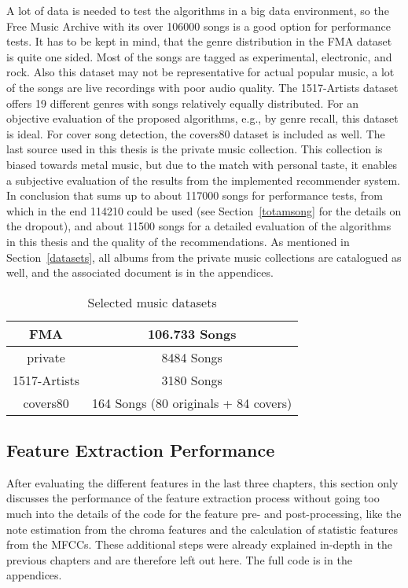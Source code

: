 A lot of data is needed to test the algorithms in a big data environment, so the Free Music Archive with its over 106000 songs is a good option for performance tests. It has to be kept in mind, that the genre distribution in the FMA dataset is quite one sided. Most of the songs are tagged as experimental, electronic, and rock. Also this dataset may not be representative for actual popular music, a lot of the songs are live recordings with poor audio quality. %
The 1517-Artists dataset offers 19 different genres with songs relatively equally distributed. For an objective evaluation of the proposed algorithms, e.g., by genre recall, this dataset is ideal. For cover song detection, the covers80 dataset is included as well.
The last source used in this thesis is the private music collection. This collection is biased towards metal music, but due to the match with personal taste, it enables a subjective evaluation of the results from the implemented recommender system.
In conclusion that sums up to about 117000 songs for performance tests, from which in the end 114210 could be used (see Section~\ref{totamsong} for the details on the dropout), and about 11500 songs for a detailed evaluation of the algorithms in this thesis and the quality of the recommendations. As mentioned in Section~\ref{datasets}, all albums from the private music collections are catalogued as well, and the associated document is in the appendices. 

\begin{table}[h]
	\label{used_dsets}
	\begin{center}
		\begin{tabular}{|c||c|}
			\hline
			FMA & 106.733 Songs\\
			\hline
			private & 8484 Songs\\
			\hline
			1517-Artists & 3180 Songs\\
			\hline
			covers80 & 164 Songs (80 originals + 84 covers)\\
			\hline
		\end{tabular}
	\end{center}
	\caption{Selected music datasets}
\end{table}
\FloatBarrier

\subsection{Feature Extraction Performance}

After evaluating the different features in the last three chapters, this section only discusses the performance of the feature extraction process without going too much into the details of the code for the feature pre- and post-processing, like the note estimation from the chroma features and the calculation of statistic features from the MFCCs. These additional steps were already explained in-depth in the previous chapters and are therefore left out here. The full code is in the appendices. 

